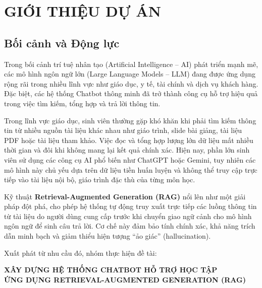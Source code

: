 \chapter{GIỚI THIỆU DỰ ÁN}

\section{Bối cảnh và Động lực}

Trong bối cảnh trí tuệ nhân tạo (Artificial Intelligence -- AI) phát triển mạnh mẽ, các mô hình ngôn ngữ lớn (Large Language Models -- LLM) đang được ứng dụng rộng rãi trong nhiều lĩnh vực như giáo dục, y tế, tài chính và dịch vụ khách hàng. Đặc biệt, các hệ thống Chatbot thông minh đã trở thành công cụ hỗ trợ hiệu quả trong việc tìm kiếm, tổng hợp và trả lời thông tin.

Trong lĩnh vực giáo dục, sinh viên thường gặp khó khăn khi phải tìm kiếm thông tin từ nhiều nguồn tài liệu khác nhau như giáo trình, slide bài giảng, tài liệu PDF hoặc tài liệu tham khảo. Việc đọc và tổng hợp lượng lớn dữ liệu mất nhiều thời gian và đôi khi không mang lại kết quả chính xác. Hiện nay, phần lớn sinh viên sử dụng các công cụ AI phổ biến như ChatGPT hoặc Gemini, tuy nhiên các mô hình này chủ yếu dựa trên dữ liệu tiền huấn luyện và không thể truy cập trực tiếp vào tài liệu nội bộ, giáo trình đặc thù của từng môn học.

Kỹ thuật \textbf{Retrieval-Augmented Generation (RAG)} nổi lên như một giải pháp đột phá, cho phép hệ thống tự động truy xuất trực tiếp các luồng thông tin từ tài liệu do người dùng cung cấp trước khi chuyển giao ngữ cảnh cho mô hình ngôn ngữ để sinh câu trả lời. Cơ chế này đảm bảo tính chính xác, khả năng trích dẫn minh bạch và giảm thiểu hiện tượng ``ảo giác'' (hallucination).

Xuất phát từ nhu cầu đó, nhóm thực hiện đề tài:
\begin{center}
  \begin{tcolorbox}[
    enhanced, colback=blue!5!white, colframe=blue!60!black,
    boxrule=1pt, arc=4pt, width=0.9\textwidth, halign=center
  ]
    {\large\bfseries XÂY DỰNG HỆ THỐNG CHATBOT HỖ TRỢ HỌC TẬP\\[0.2cm]
    ỨNG DỤNG RETRIEVAL-AUGMENTED GENERATION (RAG)}
  \end{tcolorbox}
\end{center}

